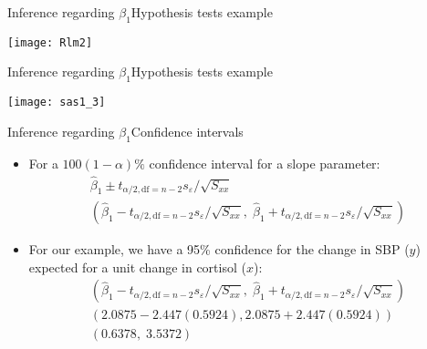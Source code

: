 \documentclass[xcolor=dvipsnames]{beamer}
\begin{document}
\begin{frame}{Inference regarding $\beta_1$}{Hypothesis tests example}
	\begin{center}
		\texttt{[image: Rlm2]}
	\end{center}
\end{frame}

\begin{frame}{Inference regarding $\beta_1$}{Hypothesis tests example}
	\begin{center}
		\texttt{[image: sas1\_3]}
	\end{center}
\end{frame}

\begin{frame}{Inference regarding $\beta_1$}{Confidence intervals}
\begin{itemize}
	\item For a $100(1-\alpha)\%$ confidence interval for a slope parameter: \pause
	\begin{gather*}
		\hat{\beta}_1 \pm t_{\alpha / 2,\text{df}=n-2} {s_{\varepsilon} / \sqrt{S_{xx}}} \\
		\left(\hat{\beta}_1 - t_{\alpha / 2,\text{df}=n-2} {s_{\varepsilon} / \sqrt{S_{xx}}},\; \hat{\beta}_1 + t_{\alpha / 2,\text{df}=n-2} {s_{\varepsilon} / \sqrt{S_{xx}}}\right)
	\end{gather*}\pause

	\item For our example, we have a 95\% confidence for the change in SBP ($y$) expected for a unit change in cortisol ($x$): \pause
	\begin{gather*}
		\left(\hat{\beta}_1 - t_{\alpha / 2,\text{df}=n-2} {s_{\varepsilon} / \sqrt{S_{xx}}},\; \hat{\beta}_1 + t_{\alpha / 2,\text{df}=n-2} {s_{\varepsilon} / \sqrt{S_{xx}}}\right) \\ 
		(2.0875 - 2.447(0.5924), 2.0875 + 2.447(0.5924))
		\\
		(0.6378,\; 3.5372)
	\end{gather*}
\end{itemize}
\end{frame}
\end{document}
